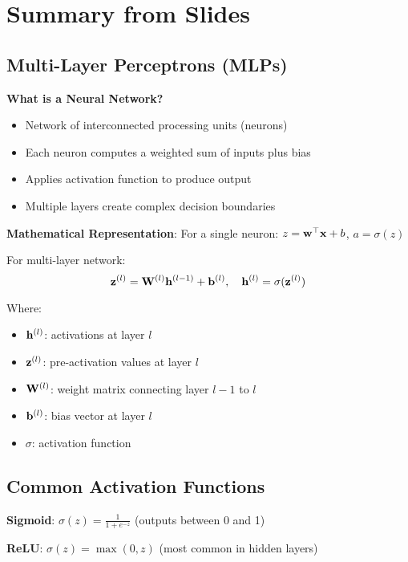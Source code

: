 \documentclass{article}
\begin{document}
\maketitle

\section{Summary from Slides}

\subsection{Multi-Layer Perceptrons (MLPs)}

\textbf{What is a Neural Network?}
\begin{itemize}
    \item Network of interconnected processing units (neurons)
    \item Each neuron computes a weighted sum of inputs plus bias
    \item Applies activation function to produce output
    \item Multiple layers create complex decision boundaries
\end{itemize}

\textbf{Mathematical Representation}:
For a single neuron: $z = \mathbf{w}^\top\mathbf{x} + b$, $a = \sigma(z)$

For multi-layer network:
$$\mathbf{z}^{(l)} = \mathbf{W}^{(l)}\mathbf{h}^{(l-1)} + \mathbf{b}^{(l)}, \quad \mathbf{h}^{(l)} = \sigma(\mathbf{z}^{(l)})$$

Where:
\begin{itemize}
    \item $\mathbf{h}^{(l)}$: activations at layer $l$
    \item $\mathbf{z}^{(l)}$: pre-activation values at layer $l$
    \item $\mathbf{W}^{(l)}$: weight matrix connecting layer $l-1$ to $l$
    \item $\mathbf{b}^{(l)}$: bias vector at layer $l$
    \item $\sigma$: activation function
\end{itemize}

\subsection{Common Activation Functions}

\textbf{Sigmoid}: $\sigma(z) = \frac{1}{1 + e^{-z}}$ (outputs between 0 and 1)

\textbf{ReLU}: $\sigma(z) = \max(0, z)$ (most common in hidden layers)
\end{document}
